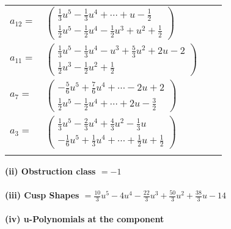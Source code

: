 \documentclass[1p]{elsarticle_modified}
\theoremstyle{definition}
\begin{document}
\begin{tabular}{m{7pt} m{180pt} m{7pt} m{180pt} }
\flushright $a_{12}=$&$\begin{pmatrix}\frac{1}{3} u^5-\frac{1}{3} u^4+\cdots+u-\frac{1}{2}\\\frac{1}{2} u^5-\frac{1}{2} u^4-\frac{1}{2} u^3+u^2+\frac{1}{2}\end{pmatrix}$ \\
\flushright $a_{11}=$&$\begin{pmatrix}\frac{1}{3} u^5-\frac{1}{3} u^4- u^3+\frac{5}{3} u^2+2 u-2\\\frac{1}{2} u^3-\frac{1}{2} u^2+\frac{1}{2}\end{pmatrix}$ \\
\flushright $a_{7}=$&$\begin{pmatrix}-\frac{5}{6} u^5+\frac{7}{6} u^4+\cdots-2 u+2\\\frac{1}{2} u^5-\frac{1}{2} u^4+\cdots+2 u-\frac{3}{2}\end{pmatrix}$ \\
\flushright $a_{3}=$&$\begin{pmatrix}\frac{1}{3} u^5-\frac{2}{3} u^4+\frac{4}{3} u^2-\frac{1}{3} u\\-\frac{1}{6} u^5+\frac{1}{3} u^4+\cdots+\frac{1}{2} u+\frac{1}{2}\end{pmatrix}$\\&\end{tabular}
\flushleft \textbf{(ii) Obstruction class $= -1$}\\~\\
\flushleft \textbf{(iii) Cusp Shapes $= \frac{10}{3} u^5-4 u^4-\frac{22}{3} u^3+\frac{50}{3} u^2+\frac{38}{3} u-14$}\\~\\
\newpage\renewcommand{\arraystretch}{1}
\flushleft \textbf{(iv) u-Polynomials at the component}\newline \\
\end{document}
